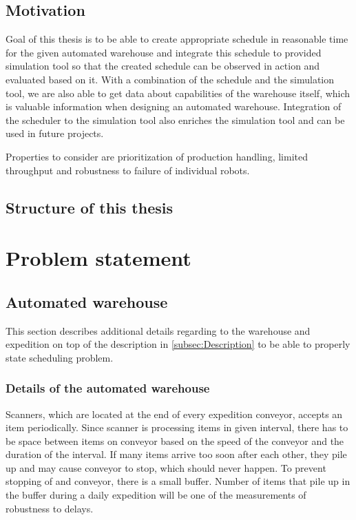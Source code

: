 \documentclass{ctuthesis}
\begin{document}
\section{Motivation}

Goal of this thesis is to be able to create appropriate schedule in reasonable time for the given automated warehouse and integrate this schedule to provided simulation tool so that the created schedule can be observed in action and evaluated based on it. With a combination of the schedule and the simulation tool, we are also able to get data about capabilities of the warehouse itself, which is valuable information when designing an automated warehouse. Integration of the scheduler to the simulation tool also enriches the simulation tool and can be used in future projects.

Properties to consider are prioritization of production handling, limited throughput and robustness to failure of individual robots. 

\section{Structure of this thesis}



\chapter{Problem statement}
\section{Automated warehouse}
\label{sec:Automated warehouse}


This section describes additional details regarding to the warehouse and expedition on top of the description in \ref{subsec:Description} to be able to properly state scheduling problem.

\subsection{Details of the automated warehouse}


Scanners, which are located at the end of every expedition conveyor, accepts an item periodically. Since scanner is processing items in given interval, there has to be space between items on conveyor based on the speed of the conveyor and the duration of the interval. If many items arrive too soon after each other, they pile up and may cause conveyor to stop, which should never happen. To prevent stopping of and conveyor, there is a small buffer. Number of items that pile up in the buffer during a daily expedition will be one of the measurements of robustness to delays.
\end{document}
